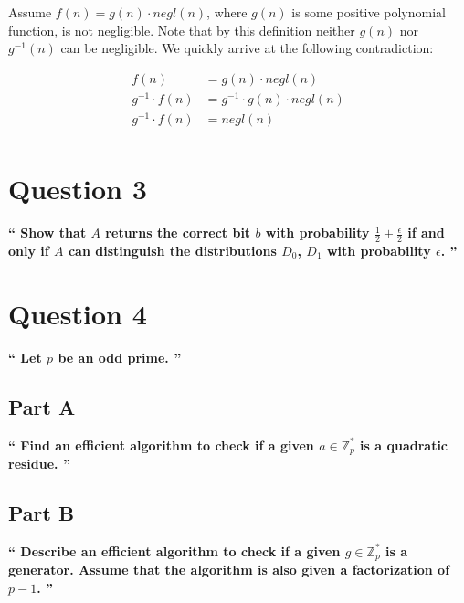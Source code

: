 \documentclass{article}
\newcommand{\HomeworkText}[1]{\textbf{``#1''}\\}
\begin{document}
	Assume $f(n) = g(n) \cdot negl(n)$, where $g(n)$ is some positive polynomial function, is not negligible. Note that by this definition neither $g(n)$ nor $g^{-1}(n)$ can be negligible. We quickly arrive at the following contradiction:
	
	\begin{equation}
	\begin{split}
	f(n) & = g(n) \cdot negl(n) \\
	g^{-1} \cdot f(n) & = g^{-1} \cdot g(n) \cdot negl(n) \\
	g^{-1} \cdot f(n) & = negl(n) \\
	\end{split}
	\end{equation}
	
	\clearpage
	\section*{Question 3}
	\HomeworkText{
		Show that $A$ returns the correct bit $b$ with probability $\frac{1}{2} + \frac{\epsilon}{2}$ if and only if $A$ can distinguish the distributions $D_0$, $D_1$ with probability $\epsilon$.
	}
	

	\clearpage
	\section*{Question 4}
	\HomeworkText{
		Let $p$ be an odd prime.
	}
	\subsection*{Part A}
	\HomeworkText{
		Find an efficient algorithm to check if a given $a \in \mathbb{Z}^{*}_{p}$ is a quadratic residue.
	}


	\subsection*{Part B}
	\HomeworkText{
		Describe an efficient algorithm to check if a given $g \in \mathbb{Z}^{*}_{p}$ is a generator. Assume that the algorithm is also given a factorization of $p - 1$.
	}
\end{document}
